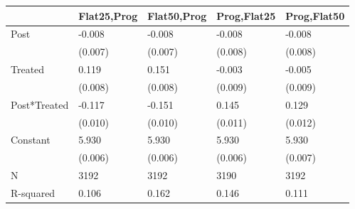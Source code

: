\begin{tabular}{lllll}
\toprule
 & Flat25,Prog & Flat50,Prog & Prog,Flat25 & Prog,Flat50 \\
\midrule
Post & -0.008 & -0.008 & -0.008 & -0.008 \\
 & (0.007) & (0.007) & (0.008) & (0.008) \\
Treated & 0.119 & 0.151 & -0.003 & -0.005 \\
 & (0.008) & (0.008) & (0.009) & (0.009) \\
Post*Treated & -0.117 & -0.151 & 0.145 & 0.129 \\
 & (0.010) & (0.010) & (0.011) & (0.012) \\
Constant & 5.930 & 5.930 & 5.930 & 5.930 \\
 & (0.006) & (0.006) & (0.006) & (0.007) \\
N & 3192 & 3192 & 3190 & 3192 \\
R-squared & 0.106 & 0.162 & 0.146 & 0.111 \\
\bottomrule
\end{tabular}
